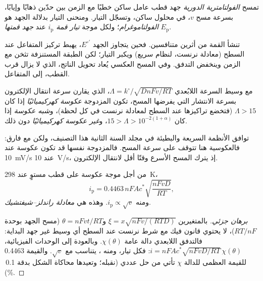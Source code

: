\begin{definition}\label{def:b3:electrode-kinetics:cv}
تمسح \emph{الفولتامترية الدورية} جهد
قطب عامل ساكن خطيًا مع الزمن بين حدّين ذهابًا وإيابًا،
بسرعة مسح $v$، في محلول ساكن، وتسجّل التيار. ومنحنى التيار
بدلالة الجهد هو \emph{الفولتاموغرام}؛ ولكل موجة
\emph{تيار قمة} $i_{\mathrm p}$ عند \emph{جهد قمتها}
$E_{\mathrm p}$.
\end{definition}

تنشأ القمة من أثرين متنافسين. فحين يتجاوز الجهد $E^{\circ\prime}$، يهبط
تركيز المتفاعل عند السطح (معادلة نرنست، لنظام
سريع) ويكبر التيار؛ لكن الطبقة المستنزفة تثخن مع الزمن 
وينخفض التدفق. وفي المسح العكسي يُعاد تحويل الناتج، الذي لا يزال قرب القطب،
إلى المتفاعل.

\begin{definition}[العكوسية]\label{def:b3:electrode-kinetics:reversibility}
مع وسيط السرعة اللابُعدي $\Lambda = k^\circ/\sqrt{DnFv/RT}$، الذي يقارن
سرعة انتقال الإلكترون بسرعة الانتشار التي يفرضها المسح، تكون
المزدوجة \emph{عكوسة كهركيميائيًا}
إذا كان $\Lambda > 15$ (فتخضع تراكيزها عند السطح لمعادلة نرنست
في كل لحظة)، و\emph{شبه عكوسة} إذا كان $15 >
\Lambda > 10^{-2(1 + \alpha)}$، و\emph{غير عكوسة كهركيميائيًا}
دون ذلك.
\end{definition}

\begin{remark}
توافق الأنظمة السريعة والبطيئة في مجلد السنة الثانية هذا
التصنيف، ولكن مع فارق: فالعكوسية هنا تتوقف على سرعة
المسح. فالمزدوجة نفسها قد تكون عكوسة عند \qty{10}{mV/s}  عند
\qty{10}{V/s}، إذ يترك المسح الأسرع وقتًا أقل لانتقال الإلكترون.
\end{remark}

\begin{proposition}\label{prop:b3:electrode-kinetics:randles-sevcik}
من أجل موجة عكوسة على قطب مستوٍ عند \qty{298}{K}،
\[
  i_{\mathrm p} = 0.4463\,nFAc^*\sqrt{\frac{nFvD}{RT}},
\]
ومنه $i_{\mathrm p} \propto \sqrt v$. وهذه هي \emph{معادلة راندلز--شيفتشيك}.
\end{proposition}

\begin{proof}[برهان جزئي]
بالمتغيرين $\xi = x\sqrt{nFv/(RTD)}$ و$\theta = nFvt/RT$ (مسح الجهد بوحدة
$RT/nF$)، لا يحتوي قانون فيك مع شرط نرنست عند السطح أي
وسيط غير جهد البداية: فالتدفق اللابعدي دالة
عامة $\chi(\theta)$. وبالعودة إلى الوحدات الفيزيائية، $i = nFAc^*\sqrt{nFvD/RT}\,\chi(\theta)$: فكل
تيار، ومنه ، يتناسب مع $\sqrt v$. والقيمة 0.4463 للقيمة العظمى للدالة
$\chi$ تأتي من حل عددي (نقبله؛ وتعيدها محاكاة الشكل
بدقة 0.1\,\%).
\end{proof}

